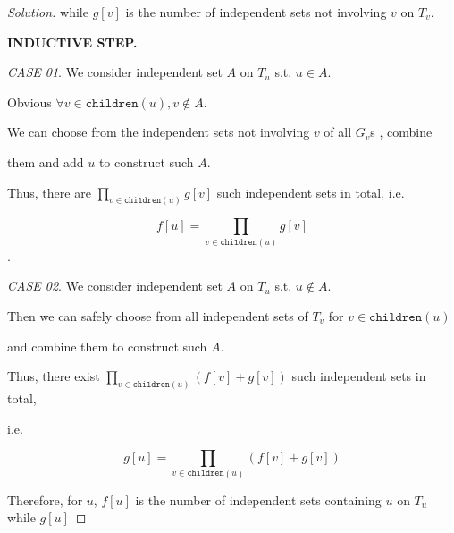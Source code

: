 \documentclass{article}
\newenvironment{solution}{\begin{proof}[\noindent\it Solution]}{\end{proof}}
\begin{document}
\begin{solution}
    \hspace{2.6em}
    while $g[v]$ is the number of independent sets not involving $v$ on $T_v$.
    
    \vspace{1em} \hspace{2.6em}
    \textbf{INDUCTIVE STEP.}
    
    \hspace{5em}
    \textit{CASE 01}. We consider independent set $A$ on $T_u$ s.t. $u\in A$. 
    
    \hspace{9.8em}
    Obvious $\forall v\in\mathtt{children}(u), v\notin A$. 
    
    \hspace{9.8em}
    We can choose from the independent sets not involving $v$ of all $G_v$s , combine 
    
    \hspace{5em}
    them and add $u$ to construct such $A$.
    
    \hspace{9.8em}
    Thus, there are $\prod_{v\in\mathtt{children}(u)}g[v]$ such independent sets in total, i.e. 
    
    \vspace{-1em}
    $$f[u]=\prod_{v\in\mathtt{children}(u)}g[v]$$.
    
    \vspace{-1.2em} \hspace{5em}
    \textit{CASE 02}. We consider independent set $A$ on $T_u$ s.t. $u\notin A$. 
    
    \hspace{9.8em}
    Then we can safely choose from all independent sets of $T_v$ for $v\in\mathtt{children}(u)$ 
    
    \hspace{5em}
    and combine them to construct such $A$.
    
    \hspace{9.8em}
    Thus, there exist $\prod_{v\in\mathtt{children}(u)}(f[v]+g[v])$ such independent sets in total,
    
    \hspace{5em}
    i.e.
    
    \vspace{-2.3em}
    $$g[u]=\prod_{v\in\mathtt{children}(u)}(f[v]+g[v])$$
    
    \vspace{1em} \hspace{5em}
    Therefore, for $u$,  $f[u]$ is the number of independent sets containing $u$ on $T_u$ while $g[u]$ 
    

\end{solution}
\end{document}
